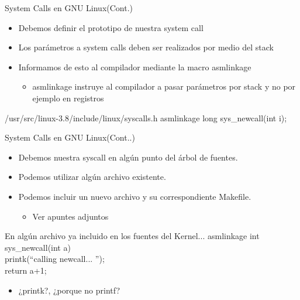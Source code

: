 \begin{frame}{System Calls en GNU Linux(Cont.)}
   \begin{itemize}  
   \item Debemos definir el prototipo de nuestra system call 
   \item Los parámetros a system calls deben ser realizados por medio del stack
   \item Informamos de esto al compilador mediante la macro asmlinkage
    \begin{itemize}
	 \item \alert{asmlinkage} instruye al compilador a pasar parámetros por stack y no 
          por ejemplo en registros 
    \end{itemize}   
 \end{itemize}

\begin{block}{/usr/src/linux-3.8/include/linux/syscalls.h}
asmlinkage long sys\_newcall(int i);

\end{block}

\end{frame}

\begin{frame}{System Calls en GNU Linux(Cont..)}
   \begin{itemize}  
   \item Debemos nuestra syscall en algún punto del árbol de fuentes. 
   \item Podemos utilizar algún archivo existente.
   \item Podemos incluir un nuevo archivo y su correspondiente Makefile. 
   \begin{itemize}
	 \item \alert{Ver apuntes adjuntos} 
    \end{itemize}   
 \end{itemize}

\begin{block}{En algún archivo ya incluido en los fuentes del Kernel...}
asmlinkage int sys\_newcall(int a) { \\
	printk(``calling newcall... '');   \\
return a+1; \\
}
\end{block}
   \begin{itemize}
	 \item \alert{¿printk?}, ¿porque no printf? 
    \end{itemize}   

\end{frame}

